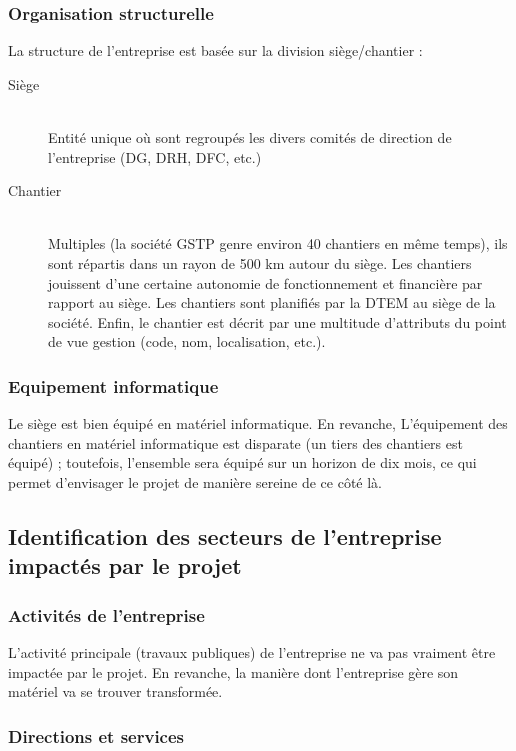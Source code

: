 \documentclass[twoside]{article}
\begin{document}
\subsubsection{Organisation structurelle}

La structure de l'entreprise est basée sur la division siège/chantier :
\begin{description}
\item[Siège]\hfill\\ 
Entité unique où sont regroupés les divers comités de direction de l'entreprise
(DG, DRH, DFC, etc.)

\item[Chantier]\hfill\\
Multiples (la société GSTP genre environ 40 chantiers en même temps),
ils sont répartis dans un rayon de 500 km autour du siège.
Les chantiers jouissent d'une certaine autonomie de fonctionnement et
financière par rapport au siège. Les chantiers sont planifiés par la DTEM
au siège de la société. Enfin, le chantier est décrit par une multitude
d'attributs du point de vue gestion (code, nom, localisation, etc.).
\end{description}


\subsubsection{Equipement informatique}

Le siège est bien équipé en matériel informatique. En revanche, 
L'équipement des chantiers en matériel informatique est disparate (un tiers
des chantiers est équipé) ; toutefois, l'ensemble sera équipé sur un horizon de
dix mois, ce qui permet d'envisager le projet de manière sereine de ce côté
là.


\subsection{Identification des secteurs de l'entreprise impactés par le projet}

\subsubsection{Activités de l'entreprise}

L'activité principale (travaux publiques) de l'entreprise ne va pas
vraiment être impactée par le projet. En revanche, la manière dont
l'entreprise gère son matériel va se trouver transformée.


\subsubsection{Directions et services}
\end{document}
